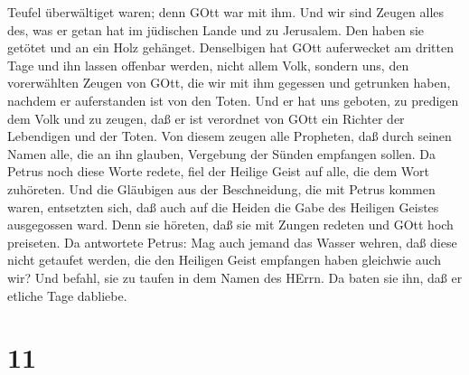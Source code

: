 Teufel überwältiget waren; denn GOtt war mit ihm.  Und wir
sind Zeugen alles des, was er getan hat im jüdischen Lande und zu
Jerusalem. Den haben sie getötet und an ein Holz gehänget. 
Denselbigen hat GOtt auferwecket am dritten Tage und ihn lassen offenbar
werden,  nicht allem Volk, sondern uns, den vorerwählten
Zeugen von GOtt, die wir mit ihm gegessen und getrunken haben, nachdem
er auferstanden ist von den Toten.  Und er hat uns geboten,
zu predigen dem Volk und zu zeugen, daß er ist verordnet von GOtt ein
Richter der Lebendigen und der Toten.  Von diesem zeugen
alle Propheten, daß durch seinen Namen alle, die an ihn glauben,
Vergebung der Sünden empfangen sollen.  Da Petrus noch
diese Worte redete, fiel der Heilige Geist auf alle, die dem Wort
zuhöreten.  Und die Gläubigen aus der Beschneidung, die mit
Petrus kommen waren, entsetzten sich, daß auch auf die Heiden die Gabe
des Heiligen Geistes ausgegossen ward.  Denn sie höreten,
daß sie mit Zungen redeten und GOtt hoch preiseten. Da antwortete
Petrus:  Mag auch jemand das Wasser wehren, daß diese nicht
getaufet werden, die den Heiligen Geist empfangen haben gleichwie auch
wir?  Und befahl, sie zu taufen in dem Namen des HErrn. Da
baten sie ihn, daß er etliche Tage dabliebe.

\hypertarget{section-10}{%
\section{11}\label{section-10}}

